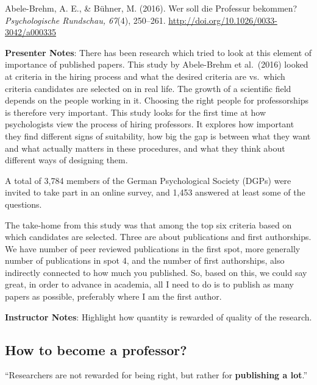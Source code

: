 \documentclass[
  letterpaper,
  DIV=11,
  numbers=noendperiod]{scrartcl}
\begin{document}
Abele-Brehm, A. E., \& Bühner, M. (2016). Wer soll die Professur
bekommen? \emph{Psychologische Rundschau, 67}(4), 250--261.
\url{http://doi.org/10.1026/0033-3042/a000335}

\textbf{Presenter Notes}: There has been research which tried to look at
this element of importance of published papers. This study by
Abele-Brehm et al.~(2016) looked at criteria in the hiring process and
what the desired criteria are vs.~which criteria candidates are selected
on in real life. The growth of a scientific field depends on the people
working in it. Choosing the right people for professorships is therefore
very important. This study looks for the first time at how psychologists
view the process of hiring professors. It explores how important they
find different signs of suitability, how big the gap is between what
they want and what actually matters in these procedures, and what they
think about different ways of designing them.

A total of 3,784 members of the German Psychological Society (DGPs) were
invited to take part in an online survey, and 1,453 answered at least
some of the questions.

The take-home from this study was that among the top six criteria based
on which candidates are selected. Three are about publications and first
authorships. We have number of peer reviewed publications in the first
spot, more generally number of publications in spot 4, and the number of
first authorships, also indirectly connected to how much you published.
So, based on this, we could say great, in order to advance in academia,
all I need to do is to publish as many papers as possible, preferably
where I am the first author.

\textbf{Instructor Notes}: Highlight how quantity is rewarded of quality
of the research.

\subsection{How to become a
professor?}\label{how-to-become-a-professor-1}

\begin{tcolorbox}[enhanced jigsaw, arc=.35mm, bottomrule=.15mm, bottomtitle=1mm, breakable, colback=white, colbacktitle=quarto-callout-important-color!10!white, colframe=quarto-callout-important-color-frame, coltitle=black, left=2mm, leftrule=.75mm, opacityback=0, opacitybacktitle=0.6, rightrule=.15mm, title=\textcolor{quarto-callout-important-color}{\faExclamation}\hspace{0.5em}{Publication Pressure}, titlerule=0mm, toprule=.15mm, toptitle=1mm]

``Researchers are not rewarded for being right, but rather for
\textbf{publishing a lot}.''

\end{tcolorbox}
\end{document}
